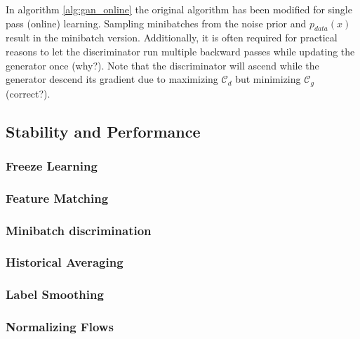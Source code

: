 In algorithm \ref{alg:gan_online} the original algorithm has been modified for single pass (online) learning.
Sampling minibatches from the noise prior and $p_{data}(x)$ result in the minibatch version.
Additionally, it is often required for practical reasons to let the discriminator run multiple backward passes while updating the generator once (why?).
Note that the discriminator will ascend while the generator descend its gradient due to maximizing $\mathcal{C}_d$ but minimizing $\mathcal{C}_g$ (correct?).

\subsection{Stability and Performance}
\label{sub:gan_stability}

\subsubsection{Freeze Learning}
\label{ssub:gan_freeze_learning}

\subsubsection{Feature Matching}
\label{ssub:gan_feature_matching}

\subsubsection{Minibatch discrimination}
\label{ssub:gan_minibatch_discrimination}

\subsubsection{Historical Averaging}
\label{ssub:gan_historical_averaging}


\subsubsection{Label Smoothing}
\label{ssub:gan_label_smoothing}


\subsubsection{Normalizing Flows}
\label{ssub:gan_nf}









